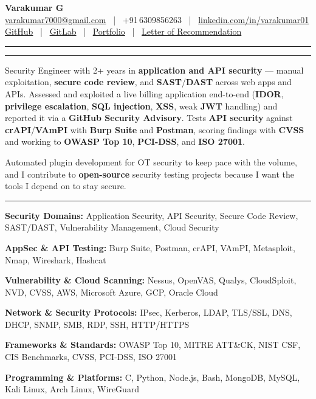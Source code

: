 \documentclass[9pt,a4paper]{extarticle}
\newcommand{\resumeSection}[1]{%
  \vspace{5pt}%
  \noindent{\large\bfseries\MakeUppercase{#1}}\par%
  \vspace{-7pt}%
  \noindent\rule{\textwidth}{0.5pt}%
  \par\vspace{0pt}%
}
\newcommand{\techrow}[2]{\noindent\textbf{#1} #2\par}
\begin{document}

\vspace*{-8pt}
\begin{center}
  {\LARGE\bfseries Varakumar G}\\[2pt]
  \href{mailto:varakumar7000@gmail.com}{varakumar7000@gmail.com}
  ~|~ +91\,6309856263
  ~|~ \href{https://www.linkedin.com/in/varakumar01}{linkedin.com/in/varakumar01}\\[1pt]
  \href{https://github.com/varakumar01}{GitHub}
  ~|~ \href{https://gitlab.com/Tony_01}{GitLab}
  ~|~ \href{https://portfolio.dragnux.com}{Portfolio}
  ~|~ \href{https://drive.google.com/file/d/17c5RtAgWn5TdRQUxnDIvLQogPoUoxgO_/view?pli=1}{Letter of Recommendation}
\end{center}
\vspace{-1pt}\noindent\rule{\textwidth}{0.7pt}

\resumeSection{Professional Summary}

Security Engineer with 2+ years in \textbf{application and API security} — manual exploitation, \textbf{secure code review}, and \textbf{SAST}/\textbf{DAST} across web apps and APIs. Assessed and exploited a live billing application end-to-end (\textbf{IDOR}, \textbf{privilege escalation}, \textbf{SQL injection}, \textbf{XSS}, weak \textbf{JWT} handling) and reported it via a \textbf{GitHub Security Advisory}. Tests \textbf{API security} against \textbf{crAPI}/\textbf{VAmPI} with \textbf{Burp Suite} and \textbf{Postman}, scoring findings with \textbf{CVSS} and working to \textbf{OWASP Top 10}, \textbf{PCI-DSS}, and \textbf{ISO 27001}.

Automated plugin development for OT security to keep pace with the volume, and I contribute to \textbf{open-source} security testing projects because I want the tools I depend on to stay secure.

\resumeSection{Technical Skills}

\techrow{Security Domains:}{Application Security, API Security, Secure Code Review, SAST/DAST, Vulnerability Management, Cloud Security}
\techrow{AppSec \& API Testing:}{Burp Suite, Postman, crAPI, VAmPI, Metasploit, Nmap, Wireshark, Hashcat}
\techrow{Vulnerability \& Cloud Scanning:}{Nessus, OpenVAS, Qualys, CloudSploit, NVD, CVSS, AWS, Microsoft Azure, GCP, Oracle Cloud}
\techrow{Network \& Security Protocols:}{IPsec, Kerberos, LDAP, TLS/SSL, DNS, DHCP, SNMP, SMB, RDP, SSH, HTTP/HTTPS}
\techrow{Frameworks \& Standards:}{OWASP Top 10, MITRE ATT\&CK, NIST CSF, CIS Benchmarks, CVSS, PCI-DSS, ISO 27001}
\techrow{Programming \& Platforms:}{C, Python, Node.js, Bash, MongoDB, MySQL, Kali Linux, Arch Linux, WireGuard}
\end{document}
